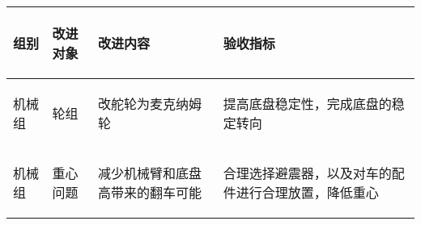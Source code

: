 
\begin{longtable}{ p{1.5cm} | p{3cm} | p{6cm} | p{4.3cm} |}

    \hline

    \endfoot
    
    \rowcolor{tabhdcolor}

        \begin{center}
            组别
        \end{center} &
        \begin{center}
            改进对象
        \end{center} &
        \begin{center}
            改进内容
        \end{center} &
        \begin{center}
            验收指标
        \end{center}\\

    \hline

    \endhead

        \begin{center}
            机械组
        \end{center} &
        \begin{center}
            轮组
        \end{center} &
        \begin{center}
            改舵轮为麦克纳姆轮
        \end{center} &
        \begin{center}
            提高底盘稳定性，完成底盘的稳定转向
        \end{center}\\
        
    \hline
        \begin{center}
            机械组
        \end{center}&
        \begin{center}
            重心问题
        \end{center}&
        \begin{center}
            减少机械臂和底盘高带来的翻车可能
        \end{center}&
        \begin{center}
            合理选择避震器，以及对车的配件进行合理放置，降低重心
        \end{center}\\
        

\end{longtable}
